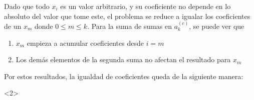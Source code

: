 \begin{center}
    \vspace{1cm}
    Dado que todo $x_i$ es un valor arbitrario, y su coeficiente no depende en lo absoluto
    del valor que tome este, el problema se reduce a igualar los coeficientes de un $x_m$
    donde $0 \leq m \leq k$.
    Para la suma de sumas en $a_k^{(c)}$, se puede ver que
    \begin{enumerate}[label=(\Roman*)]
        \item $x_m$ empieza a acumular coeficientes desde $i=m$
        \item Los demás elementos de la segunda suma no afectan el resultado para $x_m$
    \end{enumerate}
    Por estos resultados, la igualdad de coeficientes queda de la siguiente manera:
    \vspace{1cm}
    \begin{center}
        \begin{derivation}<2>
                \\
            \\
                \\
            \why*{}\\
                \\
            \\
                \\
            \\
                \\
            \\
                \\
            \why*{}\\
                \\
            \why*{}\\
        \end{derivation}
    \end{center}
\end{center}
